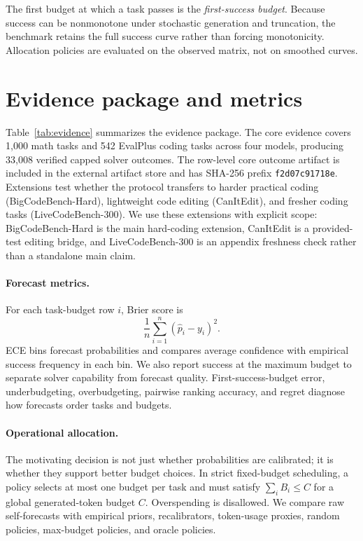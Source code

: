 \documentclass{article}
\begin{document}
The first budget at which a task passes is the \emph{first-success budget}. Because success can be nonmonotone under stochastic generation and truncation, the benchmark retains the full success curve rather than forcing monotonicity. Allocation policies are evaluated on the observed matrix, not on smoothed curves.

\section{Evidence package and metrics}



Table~\ref{tab:evidence} summarizes the evidence package. The core evidence covers 1,000 math tasks and 542 EvalPlus coding tasks across four models, producing 33,008 verified capped solver outcomes. The row-level core outcome artifact is included in the external artifact store and has SHA-256 prefix \texttt{f2d07c91718e}. Extensions test whether the protocol transfers to harder practical coding (BigCodeBench-Hard), lightweight code editing (CanItEdit), and fresher coding tasks (LiveCodeBench-300). We use these extensions with explicit scope: BigCodeBench-Hard is the main hard-coding extension, CanItEdit is a provided-test editing bridge, and LiveCodeBench-300 is an appendix freshness check rather than a standalone main claim.

\paragraph{Forecast metrics.}
For each task-budget row $i$, Brier score is
\[
\frac{1}{n}\sum_{i=1}^{n}(\hat{p}_i-y_i)^2.
\]
ECE bins forecast probabilities and compares average confidence with empirical success frequency in each bin. We also report success at the maximum budget to separate solver capability from forecast quality. First-success-budget error, underbudgeting, overbudgeting, pairwise ranking accuracy, and regret diagnose how forecasts order tasks and budgets.

\paragraph{Operational allocation.}
The motivating decision is not just whether probabilities are calibrated; it is whether they support better budget choices. In strict fixed-budget scheduling, a policy selects at most one budget per task and must satisfy $\sum_i B_i \le C$ for a global generated-token budget $C$. Overspending is disallowed. We compare raw self-forecasts with empirical priors, recalibrators, token-usage proxies, random policies, max-budget policies, and oracle policies.
\end{document}
